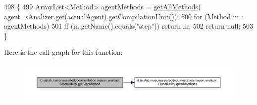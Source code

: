 \begin{DoxyCode}
498                                         \{
499         ArrayList<Method> agentMethods = \hyperlink{classit_1_1isislab_1_1masonassisteddocumentation_1_1mason_1_1analizer_1_1_global_utility_a30195b9f55f1c7dd574b09d3d9a65995}{getAllMethods}(
      \hyperlink{classit_1_1isislab_1_1masonassisteddocumentation_1_1mason_1_1analizer_1_1_global_utility_aad25923935f25b348200a005914af973}{agent\_sAnalizer}.get(\hyperlink{classit_1_1isislab_1_1masonassisteddocumentation_1_1mason_1_1analizer_1_1_global_utility_ad969120645ce5135ca95177f6bb5ce42}{actualAgent}).getCompilationUnit());
500         \textcolor{keywordflow}{for} (Method m : agentMethods)
501             \textcolor{keywordflow}{if} (m.getName().equals(\textcolor{stringliteral}{"step"})) \textcolor{keywordflow}{return} m;
502         \textcolor{keywordflow}{return} null;
503     \}
\end{DoxyCode}


Here is the call graph for this function\-:\nopagebreak
\begin{figure}[H]
\begin{center}
\leavevmode
\includegraphics[width=350pt]{classit_1_1isislab_1_1masonassisteddocumentation_1_1mason_1_1analizer_1_1_global_utility_aa9fb303191107df569745cc2178d4281_cgraph}
\end{center}
\end{figure}


